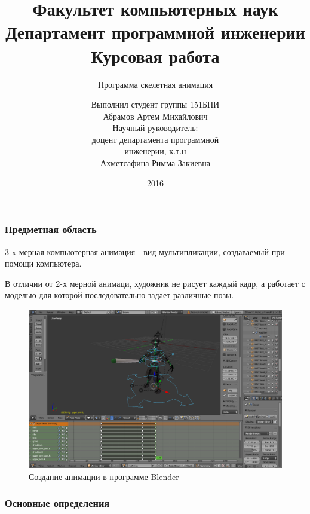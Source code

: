 \documentclass{beamer}
\title[Курсовая работа]{\scriptsize{%
Факультет компьютерных наук \\%
Департамент программной инженерии \\%
Курсовая работа \\%
}}
\subtitle{Программа скелетная анимация}
\author[Абрамов Артем 151 БПИ]{\scriptsize{%
Выполнил студент группы 151БПИ \\%
Абрамов Артем Михайлович \\%
Научный руководитель: \\%
доцент департамента программной \\%
инженерии, к.т.н \\%
Ахметсафина Римма Закиевна}}
\date{2016}
\begin{document}

\frame[plain]{\titlepage}	%




\begin{frame}
\frametitle{Предметная область}
\begin{multicols}{2}
\begin{small}
    3-x мерная компьютерная анимация - вид мультипликации, создаваемый при помощи компьютера. 
    \medskip
    
    В отличии от 2-х мерной анимаци, художник не рисует каждый кадр, а работает с моделью для которой последовательно задает различные позы.
\end{small}

\columnbreak
    
\begin{figure}[h!]
    \centering
    \includegraphics[width=1.15\columnwidth]{blender_at_work.png}
    \caption{Создание анимации в программе Blender}
\end{figure}

\end{multicols}
\end{frame}


\begin{frame}
\frametitle{Основные определения}
    
\end{frame}
\end{document}
